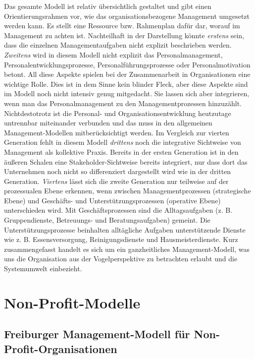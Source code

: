 \documentclass[
  letterpaper,
]{book}
\begin{document}
Das gesamte Modell ist relativ übersichtlich gestaltet und gibt einen
Orientierungsrahmen vor, wie das organisationsbezogene Management
umgesetzt werden kann. Es stellt eine Ressource bzw. Rahmenplan dafür
dar, worauf im Management zu achten ist. Nachteilhaft in der Darstellung
könnte \emph{erstens} sein, dass die einzelnen Managementaufgaben nicht
explizit beschrieben werden. \emph{Zweitens} wird in diesem Modell nicht
explizit das Personalmanagement, Personalentwicklungsprozesse,
Personalführungsprozesse oder Personalmotivation betont. All diese
Aspekte spielen bei der Zusammenarbeit in Organisationen eine wichtige
Rolle. Dies ist in dem Sinne kein blinder Fleck, aber diese Aspekte sind
im Modell noch nicht intensiv genug mitgedacht. Sie lassen sich aber
integrieren, wenn man das Personalmanagement zu den Managementprozessen
hinzuzählt. Nichtdestotrotz ist die Personal- und
Organisationsentwicklung heutzutage untrennbar miteinander verbunden und
das muss in den allgemeinen Management-Modellen mitberücksichtigt
werden. Im Vergleich zur vierten Generation fehlt in diesem Modell
\emph{drittens} noch die integrative Sichtweise von Management als
kollektive Praxis. Bereits in der ersten Generation ist in den äußeren
Schalen eine Stakeholder-Sichtweise bereits integriert, nur dass dort
das Unternehmen noch nicht so differenziert dargestellt wird wie in der
dritten Generation. \emph{Viertens} lässt sich die zweite Generation nur
teilweise auf der prozessualen Ebene erkennen, wenn zwischen
Managementprozessen (strategische Ebene) und Geschäfts- und
Unterstützungsprozessen (operative Ebene) unterschieden wird. Mit
Geschäftsprozessen sind die Alltagsaufgaben (z. B. Gruppendienste,
Betreuungs- und Beratungsaufgaben) gemeint. Die Unterstützungsprozesse
beinhalten alltägliche Aufgaben unterstützende Dienste wie z. B.
Essensversorgung, Reinigungsdienste und Hausmeisterdienste. Kurz
zusammengefasst handelt es sich um ein ganzheitliches Management-Modell,
was uns die Organisation aus der Vogelperspektive zu betrachten erlaubt
und die Systemumwelt einbezieht.

\section{Non-Profit-Modelle}\label{non-profit-modelle}

\subsection{Freiburger Management-Modell für
Non-Profit-Organisationen}\label{freiburger-management-modell-fr-non-profit-organisationen}
\end{document}
